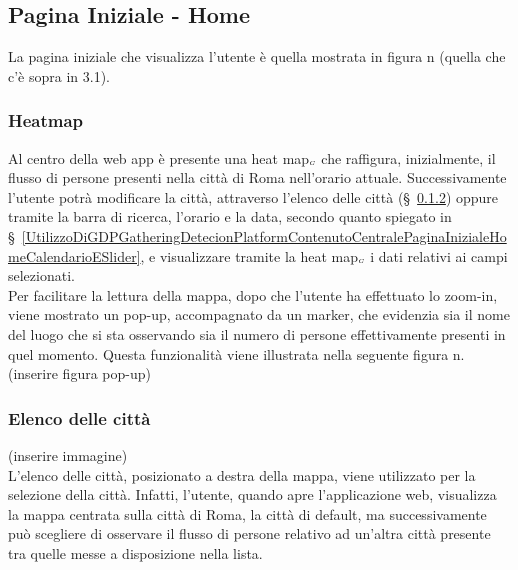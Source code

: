 \subsection{Pagina Iniziale - Home} \label{UtilizzoDiGDPGatheringDetecionPlatformContenutoCentralePaginaInizialeHome}
La pagina iniziale che visualizza l'utente è quella mostrata in figura n (quella che c'è sopra in 3.1). 
\subsubsection{Heatmap}\label{UtilizzoDiGDPGatheringDetecionPlatformContenutoCentralePaginaInizialeHomeHeatmap}
Al centro della web app è presente una heat map$_{\scaleto{G}{3pt}}$ che raffigura, inizialmente, il flusso di persone presenti nella città di Roma nell'orario attuale. Successivamente l'utente potrà modificare la città, attraverso l'elenco delle città (\S~\ref{UtilizzoDiGDPGatheringDetecionPlatformContenutoCentralePaginaInizialeHomeMenùATendina}) oppure tramite la barra di ricerca, l'orario e la data, secondo quanto spiegato in \S~\ref{UtilizzoDiGDPGatheringDetecionPlatformContenutoCentralePaginaInizialeHomeCalendarioESlider}, e visualizzare tramite la heat map$_{\scaleto{G}{3pt}}$ i dati relativi ai campi selezionati.\\
Per facilitare la lettura della mappa, dopo che l'utente ha effettuato lo zoom-in, viene mostrato un pop-up, accompagnato da un marker, che evidenzia sia il nome del luogo che si sta osservando sia il numero di persone effettivamente presenti in quel momento. Questa funzionalità viene illustrata nella seguente figura n. (inserire figura pop-up)
\subsubsection{Elenco delle città} \label{UtilizzoDiGDPGatheringDetecionPlatformContenutoCentralePaginaInizialeHomeMenùATendina}
(inserire immagine) \\
L'elenco delle città, posizionato a destra della mappa, viene utilizzato per la selezione della città. Infatti, l'utente, quando apre l'applicazione web, visualizza la mappa centrata sulla città di Roma, la città di default, ma successivamente può scegliere di osservare il flusso di persone relativo ad un'altra città presente tra quelle messe a disposizione nella lista. 

